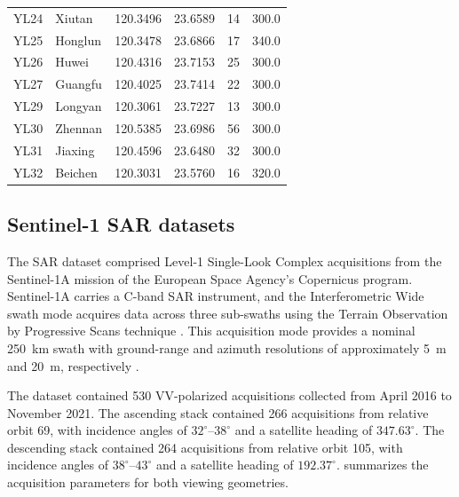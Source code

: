 \begin{table}[h!]
\begin{tabular}{llrrrr}
		YL24 & Xiutan    & 120.3496 & 23.6589 & 14 & 300.0 \\
		YL25 & Honglun   & 120.3478 & 23.6866 & 17 & 340.0 \\
		YL26 & Huwei     & 120.4316 & 23.7153 & 25 & 300.0 \\
		YL27 & Guangfu   & 120.4025 & 23.7414 & 22 & 300.0 \\
		YL29 & Longyan   & 120.3061 & 23.7227 & 13 & 300.0 \\
		YL30 & Zhennan   & 120.5385 & 23.6986 & 56 & 300.0 \\
		YL31 & Jiaxing   & 120.4596 & 23.6480 & 32 & 300.0 \\
		YL32 & Beichen   & 120.3031 & 23.5760 & 16 & 320.0 \\
		\hline
	\end{tabular}
\end{table}

\subsection{Sentinel-1 SAR datasets}
\label{subsubsec:sentinel}

The SAR dataset comprised Level-1 Single-Look Complex acquisitions from the Sentinel-1A mission of the European Space Agency's Copernicus program. Sentinel-1A carries a C-band SAR instrument, and the Interferometric Wide swath mode acquires data across three sub-swaths using the Terrain Observation by Progressive Scans technique \citep{torres_gmes_2012,yague-martinez_interferometric_2016}. This acquisition mode provides a nominal 250~km swath with ground-range and azimuth resolutions of approximately 5~m and 20~m, respectively \citep{torres_gmes_2012}.

The dataset contained 530 VV-polarized acquisitions collected from April 2016 to November 2021. The ascending stack contained 266 acquisitions from relative orbit 69, with incidence angles of $32^{\circ}$--$38^{\circ}$ and a satellite heading of $347.63^{\circ}$. The descending stack contained 264 acquisitions from relative orbit 105, with incidence angles of $38^{\circ}$--$43^{\circ}$ and a satellite heading of $192.37^{\circ}$.  summarizes the acquisition parameters for both viewing geometries.

